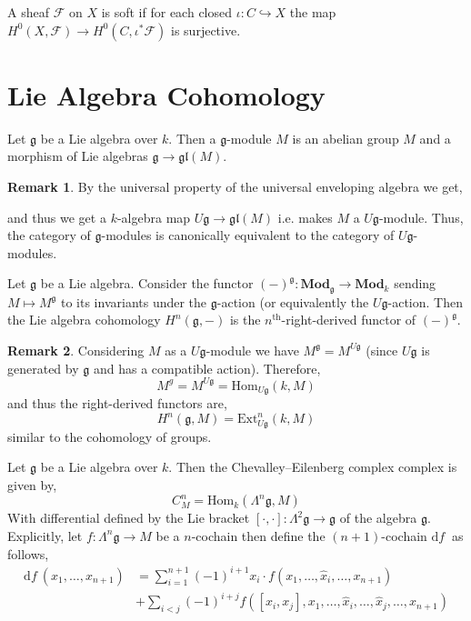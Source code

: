 \documentclass[12pt]{extarticle}
\newcommand{\Hom}[3]{\mathrm{Hom}_{#1}\left( #2, #3 \right)}
\renewcommand{\d}[1]{ \mathrm{d}#1 \:}
\theoremstyle{definition}
\newtheorem{remark}{Remark}
\newenvironment{definition}[1][Definition:]{\begin{trivlist}
\item[\hskip \labelsep {\bfseries #1}]}{\end{trivlist}}
\newcommand{\Ext}[4]{\mathrm{Ext}^{#1}_{#2} \left( #3, #4 \right)}
\newcommand{\F}{\mathcal{F}}
\newcommand{\g}{\mathfrak{g}}
\newcommand{\gl}[1]{\mathfrak{gl}\left(#1\right)}
\newcommand{\embed}{\hookrightarrow}
\begin{document}
\begin{definition}
A sheaf $\F$ on $X$ is soft if for each closed $\iota : C \embed X$ the map $H^0(X, \F) \to H^0(C, \iota^* \F)$ is surjective. 
\end{definition}

\section{Lie Algebra Cohomology}

\begin{definition}
Let $\g$ be a Lie algebra over $k$. Then a $\g$-module $M$ is an abelian group $M$ and a morphism of Lie algebras $\g \to \gl{M}$. 
\end{definition}

\begin{remark}
By the universal property of the universal enveloping algebra we get,
\begin{center}
\end{center}
and thus we get a $k$-algebra map $U \g \to \gl{M}$ i.e. makes $M$ a $U \g$-module. Thus, the category of $\g$-modules is canonically equivalent to the category of $U \g$-modules. 
\end{remark}

\begin{definition}
Let $\g$ be a Lie algebra. Consider the functor $(-)^\g : \mathbf{Mod}_\g \to \mathbf{Mod}_k$ sending $M \mapsto M^\g$ to its invariants under the $\g$-action (or equivalently the $U \g$-action. Then the Lie algebra cohomology $H^n(\g, -)$ is the $n^{\text{th}}$-right-derived functor of $(-)^\g$.  
\end{definition}

\begin{remark}
Considering $M$ as a $U\g$-module we have $M^\g = M^{U \g}$ (since $U \g$ is generated by $\g$ and has a compatible action). Therefore,
\[ M^g = M^{U \g} = \Hom{U \g}{k}{M} \]
and thus the right-derived functors are,
\[ H^n(\g, M) = \Ext{n}{U \g}{k}{M} \]
similar to the cohomology of groups.
\end{remark}


\begin{definition}
Let $\g$ be a Lie algebra over $k$. Then the Chevalley–Eilenberg complex complex is given by,
\[ C_M^n = \Hom{k}{\Lambda^n \g}{M} \]
With differential defined by the Lie bracket $[\cdot,\cdot] : \Lambda^2 \g \to \g$ of the algebra $\g$. Explicitly, let $f : \Lambda^n \g \to M$ be a $n$-cochain then define the $(n+1)$-cochain $\d{f}$ as follows,
\begin{align*}
\d{f}(x_1, \dots, x_{n+1}) & = \sum_{i = 1}^{n+1} (-1)^{i + 1} x_i \cdot f(x_1, \dots, \hat{x}_i, \dots, x_{n+1}) 
\\
& + \sum_{i < j} (-1)^{i + j} f([x_i, x_j], x_1, \dots, \hat{x}_i, \dots, \hat{x}_j, \dots, x_{n+1})
\end{align*}
\end{definition}
\end{document}
